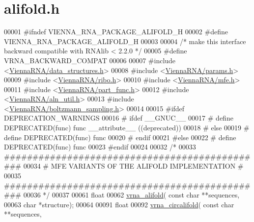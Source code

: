 \hypertarget{alifold_8h_source}{}\section{alifold.\+h}
\label{alifold_8h_source}

\begin{DoxyCode}
00001 \textcolor{preprocessor}{#ifndef VIENNA\_RNA\_PACKAGE\_ALIFOLD\_H}
00002 \textcolor{preprocessor}{#define VIENNA\_RNA\_PACKAGE\_ALIFOLD\_H}
00003 
00004 \textcolor{comment}{/* make this interface backward compatible with RNAlib < 2.2.0 */}
00005 \textcolor{preprocessor}{#define VRNA\_BACKWARD\_COMPAT}
00006 
00007 \textcolor{preprocessor}{#include <\hyperlink{data__structures_8h}{ViennaRNA/data\_structures.h}>}
00008 \textcolor{preprocessor}{#include <\hyperlink{params_8h}{ViennaRNA/params.h}>}
00009 \textcolor{preprocessor}{#include <\hyperlink{ribo_8h}{ViennaRNA/ribo.h}>}
00010 \textcolor{preprocessor}{#include <\hyperlink{mfe_8h}{ViennaRNA/mfe.h}>}
00011 \textcolor{preprocessor}{#include <\hyperlink{part__func_8h}{ViennaRNA/part\_func.h}>}
00012 \textcolor{preprocessor}{#include <\hyperlink{aln__util_8h}{ViennaRNA/aln\_util.h}>}
00013 \textcolor{preprocessor}{#include <\hyperlink{boltzmann__sampling_8h}{ViennaRNA/boltzmann\_sampling.h}>}
00014 
00015 \textcolor{preprocessor}{#ifdef DEPRECATION\_WARNINGS}
00016 \textcolor{preprocessor}{# ifdef \_\_GNUC\_\_}
00017 \textcolor{preprocessor}{#  define DEPRECATED(func) func \_\_attribute\_\_ ((deprecated))}
00018 \textcolor{preprocessor}{# else}
00019 \textcolor{preprocessor}{#  define DEPRECATED(func) func}
00020 \textcolor{preprocessor}{# endif}
00021 \textcolor{preprocessor}{#else}
00022 \textcolor{preprocessor}{# define DEPRECATED(func) func}
00023 \textcolor{preprocessor}{#endif}
00024 
00032 \textcolor{comment}{/*}
00033 \textcolor{comment}{##############################################}
00034 \textcolor{comment}{# MFE VARIANTS OF THE ALIFOLD IMPLEMENTATION #}
00035 \textcolor{comment}{##############################################}
00036 \textcolor{comment}{*/}
00037 
00061 \textcolor{keywordtype}{float}
00062 \hyperlink{group__consensus__mfe__fold_ga6c9d3bef3e92c6d423ffac9f981418c1}{vrna\_alifold}( \textcolor{keyword}{const} \textcolor{keywordtype}{char} **sequences,
00063               \textcolor{keywordtype}{char} *structure);
00064 
00091 \textcolor{keywordtype}{float}
00092 \hyperlink{group__consensus__mfe__fold_ga17a1be7490468c29c335ba9bffacba53}{vrna\_circalifold}( \textcolor{keyword}{const} \textcolor{keywordtype}{char} **sequences,

\end{DoxyCode}
